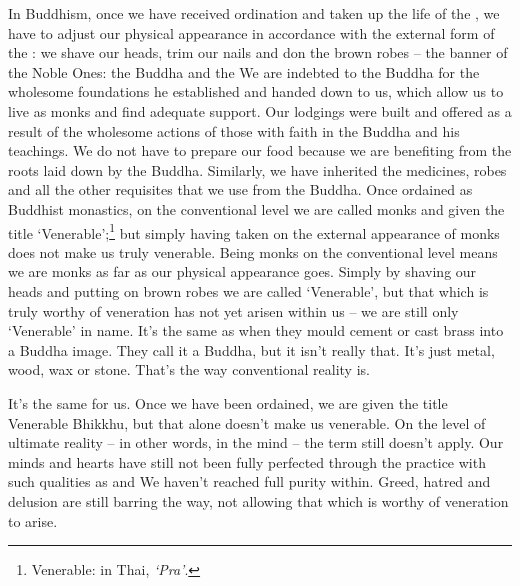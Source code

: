 In Buddhism, once we have received ordination and taken up the life of the , we have to adjust our physical appearance in accordance with the external form of the : we shave our heads, trim our nails and don the brown  robes -- the banner of the Noble Ones: the Buddha and the  We are indebted to the Buddha for the wholesome foundations he established and handed down to us, which allow us to live as monks and find adequate support. Our lodgings were built and offered as a result of the wholesome actions of those with faith in the Buddha and his teachings. We do not have to prepare our food because we are benefiting from the roots laid down by the Buddha. Similarly, we have inherited the medicines, robes and all the other requisites that we use from the Buddha. Once ordained as Buddhist monastics, on the conventional level we are called monks and given the title `Venerable';\footnote{Venerable: in Thai, \textit{`Pra'}.} but simply having taken on the external appearance of monks does not make us truly venerable. Being monks on the conventional level means we are monks as far as our physical appearance goes. Simply by shaving our heads and putting on brown robes we are called `Venerable', but that which is truly worthy of veneration has not yet arisen within us -- we are still only `Venerable' in name. It's the same as when they mould cement or cast brass into a Buddha image. They call it a Buddha, but it isn't really that. It's just metal, wood, wax or stone. That's the way conventional reality is.

It's the same for us. Once we have been ordained, we are given the title Venerable Bhikkhu, but that alone doesn't make us venerable. On the level of ultimate reality -- in other words, in the mind -- the term still doesn't apply. Our minds and hearts have still not been fully perfected through the practice with such qualities as    and  We haven't reached full purity within. Greed, hatred and delusion are still barring the way, not allowing that which is worthy of veneration to arise.

